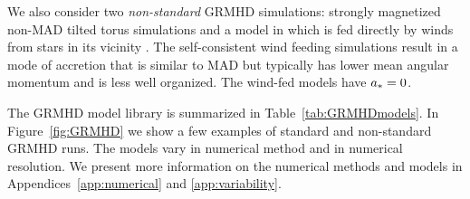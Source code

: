 We also consider two \emph{non-standard} GRMHD simulations: strongly magnetized non-MAD tilted torus simulations \citep{Liska2018, Chatterjee2020} and a model in which \sgra is fed directly by winds from stars in its vicinity \citep{2020ApJ...896L...6R}.
The self-consistent wind feeding simulations result in a mode of accretion that is similar to MAD but typically has lower mean angular momentum and is less well organized.
The wind-fed models have $a_* = 0$.

The GRMHD model library is summarized in Table~\ref{tab:GRMHDmodels}.
In Figure~\ref{fig:GRMHD} we show a few examples of standard and non-standard GRMHD runs.
The models vary in numerical method and in numerical resolution. We present more information on the numerical methods and models in Appendices~\ref{app:numerical} and \ref{app:variability}.

